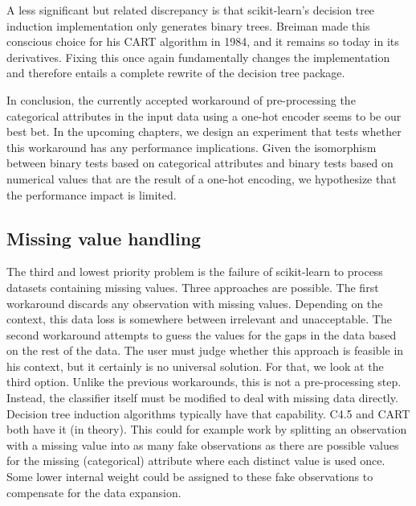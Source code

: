 A less significant but related discrepancy is that scikit-learn's decision tree induction implementation only generates binary trees. Breiman made this conscious choice for his CART algorithm in 1984, and it remains so today in its derivatives. Fixing this once again fundamentally changes the implementation and therefore entails a complete rewrite of the decision tree package.

In conclusion, the currently accepted workaround of pre-processing the categorical attributes in the input data using a one-hot encoder seems to be our best bet. In the upcoming chapters, we design an experiment that tests whether this workaround has any performance implications. Given the isomorphism between binary tests based on categorical attributes and binary tests based on numerical values that are the result of a one-hot encoding, we hypothesize that the performance impact is limited.


\subsection{Missing value handling}
The third and lowest priority problem is the failure of scikit-learn to process datasets containing missing values. Three approaches are possible. The first workaround discards any observation with missing values. Depending on the context, this data loss is somewhere between irrelevant and unacceptable. The second workaround attempts to guess the values for the gaps in the data based on the rest of the data. The user must judge whether this approach is feasible in his context, but it certainly is no universal solution. For that, we look at the third option. Unlike the previous workarounds, this is not a pre-processing step. Instead, the classifier itself must be modified to deal with missing data directly. Decision tree induction algorithms typically have that capability. C4.5 and CART both have it (in theory). This could for example work by splitting an observation with a missing value into as many fake observations as there are possible values for the missing (categorical) attribute where each distinct value is used once. Some lower internal weight could be assigned to these fake observations to compensate for the data expansion.

